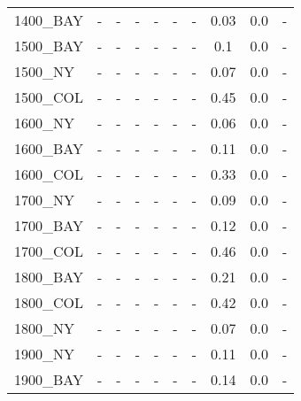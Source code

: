 \documentclass[main.tex]{subfiles}
\begin{document}
\begin{center}
\begin{tabular}{lccccccccc}
1400\_BAY & - & - 
 & - & - 
 & - & - 
 & 0.03 & 0.0 & - \\
1500\_BAY & - & - 
 & - & - 
 & - & - 
 & 0.1 & 0.0 & - \\
1500\_NY & - & - 
 & - & - 
 & - & - 
 & 0.07 & 0.0 & - \\
1500\_COL & - & - 
 & - & - 
 & - & - 
 & 0.45 & 0.0 & - \\
1600\_NY & - & - 
 & - & - 
 & - & - 
 & 0.06 & 0.0 & - \\
1600\_BAY & - & - 
 & - & - 
 & - & - 
 & 0.11 & 0.0 & - \\
1600\_COL & - & - 
 & - & - 
 & - & - 
 & 0.33 & 0.0 & - \\
1700\_NY & - & - 
 & - & - 
 & - & - 
 & 0.09 & 0.0 & - \\
1700\_BAY & - & - 
 & - & - 
 & - & - 
 & 0.12 & 0.0 & - \\
1700\_COL & - & - 
 & - & - 
 & - & - 
 & 0.46 & 0.0 & - \\
1800\_BAY & - & - 
 & - & - 
 & - & - 
 & 0.21 & 0.0 & - \\
1800\_COL & - & - 
 & - & - 
 & - & - 
 & 0.42 & 0.0 & - \\
1800\_NY & - & - 
 & - & - 
 & - & - 
 & 0.07 & 0.0 & - \\
1900\_NY & - & - 
 & - & - 
 & - & - 
 & 0.11 & 0.0 & - \\
1900\_BAY & - & - 
 & - & - 
 & - & - 
 & 0.14 & 0.0 & - \\
\hline\end{tabular}
\end{center}
\newpage
\end{document}
